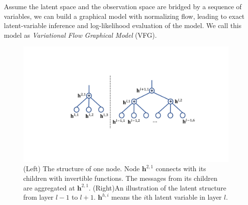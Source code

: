 \documentclass{article} %
\begin{document}
Assume the latent space and the observation space are bridged by a sequence of variables, we can build a graphical model with normalizing flow, leading to exact latent-variable inference and log-likelihood evaluation of the model. We call this model as \textit{Variational Flow Graphical Model} (VFG).
\begin{figure}
\begin{center}
 \includegraphics[width=1.0\linewidth]{fig/node.pdf}
\end{center}
\vspace{-0.2in}
\caption{ {\small (Left) The structure of one node. Node $\mathbf{h}^{2,1}$ connects with its children with invertible functions. The messages from its children are aggregated at $\mathbf{h}^{2,1}$.   (Right)An illustration of the latent structure from layer $l-1$ to $l+1$.  $\mathbf{h}^{h, i}$ means the $i$th latent variable  in layer $l$.}}
\label{fig:node_tree}
\vspace{-0.25in}
\end{figure}
\end{document}
